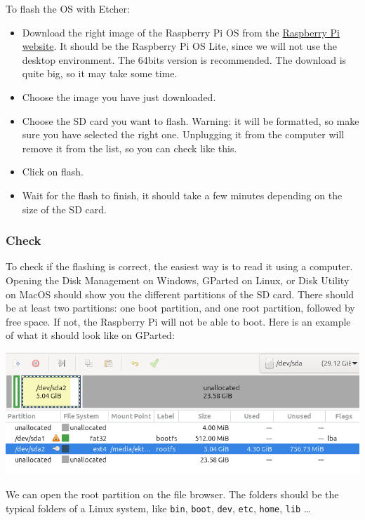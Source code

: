 \documentclass{article}
\begin{document}
To flash the OS with Etcher:
\begin{itemize}
    \item Download the right image of the Raspberry Pi OS from the
        \href{https://www.raspberrypi.com/software/operating-systems/}{Raspberry Pi website}.
        It should be the Raspberry Pi OS Lite, since we will not use the desktop environment.
        The 64bits version is recommended.
        The download is quite big, so it may take some time.
    \item Choose the image you have just downloaded.
    \item Choose the SD card you want to flash. Warning: it will be formatted, so make sure you
        have selected the right one. Unplugging it from the computer will remove it from the list,
        so you can check like this.
    \item Click on flash.
    \item Wait for the flash to finish, it should take a few minutes depending on the size of the
        SD card.
\end{itemize}

\subsubsection{Check}

To check if the flashing is correct, the easiest way is to read it using a computer.
Opening the Disk Management on Windows, GParted on Linux, or Disk Utility on MacOS should show you
the different partitions of the SD card.
There should be at least two partitions: one boot partition, and one root partition, followed by
free space. If not, the Raspberry Pi will not be able to boot.
Here is an example of what it should look like on GParted:

\includegraphics[scale=0.4]{img/partitions_gparted.png}

We can open the root partition on the file browser. The folders should be the typical folders of a
Linux system, like \texttt{bin}, \texttt{boot}, \texttt{dev}, \texttt{etc}, \texttt{home},
\texttt{lib} \dots
\end{document}
